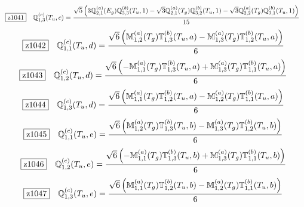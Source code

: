 \documentclass[fleqn,10pt,landscape]{jsarticle}
\begin{document}
\begin{dmath*}
\hspace*{3mm}\fbox{z1041}\quad \mathbb{Q}_{1,3}^{(c)}(T_{u},c)=\frac{\sqrt{5} \left(3 \mathbb{Q}_{2,1}^{(a)}(E_{g}) \mathbb{Q}_{3,3}^{(b)}(T_{u},1) - \sqrt{3} \mathbb{Q}_{2,1}^{(a)}(T_{g}) \mathbb{Q}_{3,2}^{(b)}(T_{u},1) - \sqrt{3} \mathbb{Q}_{2,2}^{(a)}(T_{g}) \mathbb{Q}_{3,1}^{(b)}(T_{u},1)\right)}{15}
\end{dmath*}
\begin{dmath*}
\hspace*{3mm}\fbox{z1042}\quad \mathbb{Q}_{1,1}^{(c)}(T_{u},d)=\frac{\sqrt{6} \left(\mathbb{M}_{1,2}^{(a)}(T_{g}) \mathbb{T}_{1,3}^{(b)}(T_{u},a) - \mathbb{M}_{1,3}^{(a)}(T_{g}) \mathbb{T}_{1,2}^{(b)}(T_{u},a)\right)}{6}
\end{dmath*}
\begin{dmath*}
\hspace*{3mm}\fbox{z1043}\quad \mathbb{Q}_{1,2}^{(c)}(T_{u},d)=\frac{\sqrt{6} \left(- \mathbb{M}_{1,1}^{(a)}(T_{g}) \mathbb{T}_{1,3}^{(b)}(T_{u},a) + \mathbb{M}_{1,3}^{(a)}(T_{g}) \mathbb{T}_{1,1}^{(b)}(T_{u},a)\right)}{6}
\end{dmath*}
\begin{dmath*}
\hspace*{3mm}\fbox{z1044}\quad \mathbb{Q}_{1,3}^{(c)}(T_{u},d)=\frac{\sqrt{6} \left(\mathbb{M}_{1,1}^{(a)}(T_{g}) \mathbb{T}_{1,2}^{(b)}(T_{u},a) - \mathbb{M}_{1,2}^{(a)}(T_{g}) \mathbb{T}_{1,1}^{(b)}(T_{u},a)\right)}{6}
\end{dmath*}
\begin{dmath*}
\hspace*{3mm}\fbox{z1045}\quad \mathbb{Q}_{1,1}^{(c)}(T_{u},e)=\frac{\sqrt{6} \left(\mathbb{M}_{1,2}^{(a)}(T_{g}) \mathbb{T}_{1,3}^{(b)}(T_{u},b) - \mathbb{M}_{1,3}^{(a)}(T_{g}) \mathbb{T}_{1,2}^{(b)}(T_{u},b)\right)}{6}
\end{dmath*}
\begin{dmath*}
\hspace*{3mm}\fbox{z1046}\quad \mathbb{Q}_{1,2}^{(c)}(T_{u},e)=\frac{\sqrt{6} \left(- \mathbb{M}_{1,1}^{(a)}(T_{g}) \mathbb{T}_{1,3}^{(b)}(T_{u},b) + \mathbb{M}_{1,3}^{(a)}(T_{g}) \mathbb{T}_{1,1}^{(b)}(T_{u},b)\right)}{6}
\end{dmath*}
\begin{dmath*}
\hspace*{3mm}\fbox{z1047}\quad \mathbb{Q}_{1,3}^{(c)}(T_{u},e)=\frac{\sqrt{6} \left(\mathbb{M}_{1,1}^{(a)}(T_{g}) \mathbb{T}_{1,2}^{(b)}(T_{u},b) - \mathbb{M}_{1,2}^{(a)}(T_{g}) \mathbb{T}_{1,1}^{(b)}(T_{u},b)\right)}{6}
\end{dmath*}
\end{document}
